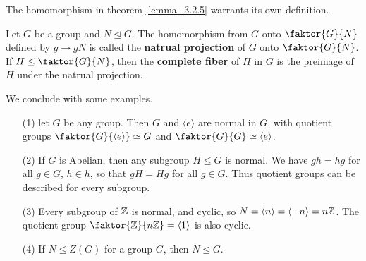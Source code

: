 The homomorphism in theorem \ref{lemma_3.2.5} warrants its own definition.

\begin{definition}
  Let $G$ be a group and  $N \unlhd G$. The homomorphism from $G$ onto
  $\faktor{G}{N}$ defined by $g \rightarrow gN$ is called the \textbf{natrual
  projection} of $G$ onto  $\faktor{G}{N}$. If $H \leq \faktor{G}{N}$, then
  the \textbf{complete fiber} of $H$ in  $G$ is the preimage of $H$ under the
  natrual projection.
\end{definition}

We conclude with some examples.

\begin{example}\label{example_3.4}
  \begin{enumerate}
    \item[(1)] let $G$ be any group. Then $G$ and $\langle e \rangle$ are normal
      in $G$, with quotient groups $\faktor{G}{\langle e \rangle} \simeq G$ and
      $\faktor{G}{G} \simeq \vbrack{e}$.

    \item[(2)] If $G$ is Abelian, then any subgroup  $H \leq G$ is normal.
      We have  $gh=hg$ for all  $g \in G$,  $h \in h$, so that  $gH=Hg$
      for all  $g \in G$. Thus quotient groups can be described for every
      subgroup.

    \item [(3)] Every subgroup of $\mathbb{Z}$ is normal, and cyclic, so
      $N=\langle n \rangle=\langle -n \rangle=n\mathbb{Z}$. The quotient group
      $\faktor{\Z}{n\Z}=\langle 1 \rangle$ is also cyclic.

    \item[(4)] If $N \leq Z(G)$ for a group $G$, then  $N \unlhd G$.
  \end{enumerate}
\end{example}
